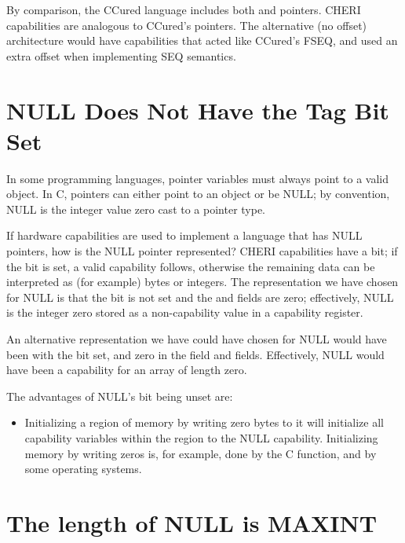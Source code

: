 By comparison, the CCured language includes both  and
 pointers. CHERI capabilities are analogous to CCured's
 pointers. The alternative (no offset) architecture
would have capabilities that acted like CCured's FSEQ, and used an extra
offset when implementing SEQ semantics.

\section{NULL Does Not Have the Tag Bit Set}

In some programming languages, pointer variables must always point to
a valid object. In C, pointers can either point to an object or be NULL;
by convention, NULL is the integer value zero cast to a pointer type.

If hardware capabilities are used to implement a language that has NULL
pointers, how is the NULL pointer represented? CHERI capabilities have
a \ctag{} bit; if the \ctag{} bit is set, a valid capability follows, otherwise
the remaining data can be interpreted as (for example) bytes or integers.
The representation we have chosen for NULL is that the \ctag{} bit is not set
and the \cbase{} and \clength{} fields are zero; effectively, NULL is the
integer zero stored as a non-capability value in a capability register.

An alternative representation we have could have chosen for NULL would
have been with the \ctag{} bit set, and zero in the \cbase{} field and
\clength{} fields.  Effectively, NULL would have been a capability for
an array of length zero.

The advantages of NULL's \ctag{} bit being unset are:

\begin{itemize}
\item
Initializing a region of memory by writing zero bytes to it will initialize
all capability variables within the region to the NULL capability. Initializing
memory by writing zeros is, for example, done by the C 
function, and by some operating systems.
\end{itemize}

\section{The length of NULL is MAXINT}

